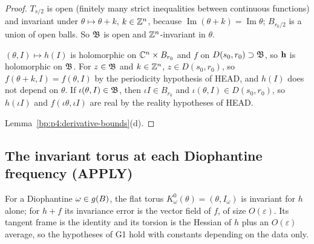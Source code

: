 \begin{proof}
\label{step:p4:h1-open}
$T_{s/2}$ is open (finitely many strict inequalities between continuous functions) and invariant
under $\theta\mapsto\theta+k$, $k\in\mathbb{Z}^n$, because $\operatorname{Im}(\theta+k)=\operatorname{Im}\theta$;
$B_{r_0/2}$ is a union of open balls. So $\mathfrak{B}$ is open and $\mathbb{Z}^n$-invariant in $\theta$.

\label{step:p4:h1-holo}
$(\theta,I)\mapsto h(I)$ is holomorphic on $\mathbb{C}^n\times B_{r_0}$ and $f$ on
$D(s_0,r_0)\supset\mathfrak{B}$, so $\mathbf{h}$ is holomorphic on $\mathfrak{B}$. For $z\in\mathfrak{B}$ and $k\in\mathbb{Z}^n$,
$z\in D(s_0,r_0)$, so $f(\theta+k,I)=f(\theta,I)$ by the periodicity hypothesis of HEAD, and $h(I)$
does not depend on $\theta$. If $\iota(\theta,I)\in\mathfrak{B}$, then $\iota I\in B_{r_0}$ and
$\iota(\theta,I)\in D(s_0,r_0)$, so $h(\iota I)$ and $f(\iota\theta,\iota I)$ are real by the
reality hypotheses of HEAD.

\label{step:p4:h1-bounds}
Lemma~\ref{bp:p4:derivative-bounds}(d).
\end{proof}

\subsection{The invariant torus at each Diophantine frequency (APPLY)}\label{bp:p4:sec-apply}

For a Diophantine $\omega\in g(B)$, the flat torus $K^0_\omega(\theta)=(\theta,I_\omega)$ is
invariant for $h$ alone; for $h+f$ its invariance error is the vector field of $f$, of size
$O(\varepsilon)$. Its tangent frame is the identity and its torsion is the Hessian of $h$ plus an
$O(\varepsilon)$ average, so the hypotheses of G1 hold with constants depending on the data only.


